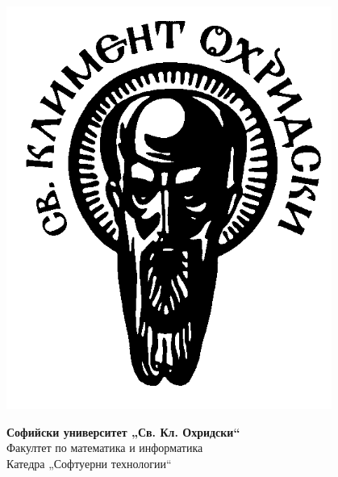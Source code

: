 \begin{titlepage}
  \large
  
  \begin{center}
    \begin{minipage}{0.15\textwidth}
      \begin{flushleft}
        \includegraphics[width=0.8\textwidth]{images/logo-su.png}
      \end{flushleft}
    \end{minipage}%
    \begin{minipage}{0.7\textwidth}
      \begin{center}
        \textbf{Софийски университет „Св. Кл. Охридски“}\\[1ex]
        Факултет по математика и информатика\\[1ex]
        Катедра „Софтуерни технологии“\\[1ex]
      \end{center}
    \end{minipage}%
    \begin{minipage}{0.15\textwidth}
      \begin{flushright}

\end{flushright}
\end{minipage}
\end{center}
\end{titlepage}
